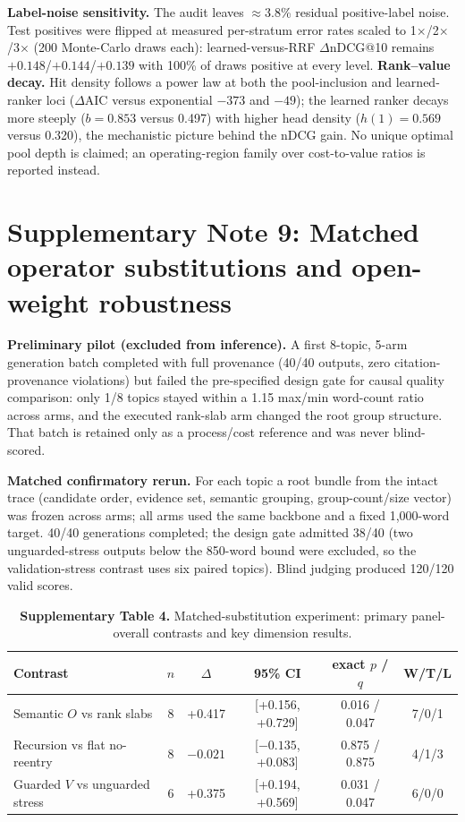 \documentclass[11pt,a4paper]{article}
\newcommand{\snote}[1]{\section*{Supplementary Note #1}}
\begin{document}
\textbf{Label-noise sensitivity.} The audit leaves $\approx$3.8\% residual positive-label noise. Test positives were flipped at measured per-stratum error rates scaled to 1$\times$/2$\times$/3$\times$ (200 Monte-Carlo draws each): learned-versus-RRF $\Delta$nDCG@10 remains $+0.148$/$+0.144$/$+0.139$ with 100\% of draws positive at every level. \textbf{Rank--value decay.} Hit density follows a power law at both the pool-inclusion and learned-ranker loci ($\Delta$AIC versus exponential $-373$ and $-49$); the learned ranker decays more steeply ($b=0.853$ versus 0.497) with higher head density ($h(1)=0.569$ versus 0.320), the mechanistic picture behind the nDCG gain. No unique optimal pool depth is claimed; an operating-region family over cost-to-value ratios is reported instead.

\snote{9: Matched operator substitutions and open-weight robustness}

\textbf{Preliminary pilot (excluded from inference).} A first 8-topic, 5-arm generation batch completed with full provenance (40/40 outputs, zero citation-provenance violations) but failed the pre-specified design gate for causal quality comparison: only 1/8 topics stayed within a 1.15 max/min word-count ratio across arms, and the executed rank-slab arm changed the root group structure. That batch is retained only as a process/cost reference and was never blind-scored.

\textbf{Matched confirmatory rerun.} For each topic a root bundle from the intact trace (candidate order, evidence set, semantic grouping, group-count/size vector) was frozen across arms; all arms used the same backbone and a fixed 1,000-word target. 40/40 generations completed; the design gate admitted 38/40 (two unguarded-stress outputs below the 850-word bound were excluded, so the validation-stress contrast uses six paired topics). Blind judging produced 120/120 valid scores.

\begin{table}[h]
\caption*{\textbf{Supplementary Table 4.} Matched-substitution experiment: primary panel-overall contrasts and key dimension results.}
\centering
\small
\begin{tabular}{@{}lccccc@{}}
\toprule
Contrast & $n$ & $\Delta$ & 95\% CI & exact $p$ / $q$ & W/T/L \\
\midrule
Semantic $O$ vs rank slabs & 8 & +0.417 & [+0.156, +0.729] & 0.016 / 0.047 & 7/0/1 \\
Recursion vs flat no-reentry & 8 & $-0.021$ & [$-0.135$, +0.083] & 0.875 / 0.875 & 4/1/3 \\
Guarded $V$ vs unguarded stress & 6 & +0.375 & [+0.194, +0.569] & 0.031 / 0.047 & 6/0/0 \\
\bottomrule
\end{tabular}
\end{table}
\end{document}
